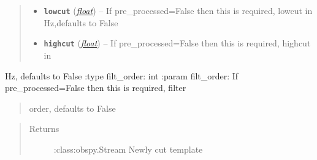 \documentclass[a4paper,10pt,english]{sphinxmanual}
\begin{document}
\begin{fulllineitems}
\begin{quote}
\begin{description}
\begin{itemize}
\item {} 
\textbf{\texttt{lowcut}} (\href{https://docs.python.org/library/functions.html\#float}{\emph{float}}) -- If pre\_processed=False then this is required, lowcut in Hz,defaults to False

\item {} 
\textbf{\texttt{highcut}} (\href{https://docs.python.org/library/functions.html\#float}{\emph{float}}) -- If pre\_processed=False then this is required, highcut in

\end{itemize}

\end{description}\end{quote}

Hz, defaults to False
:type filt\_order: int
:param filt\_order: If pre\_processed=False then this is required, filter
\begin{quote}

order, defaults to False
\end{quote}
\begin{quote}\begin{description}
\item[{Returns}] \leavevmode
:class:obspy.Stream Newly cut template

\end{description}\end{quote}

\end{fulllineitems}

\end{document}
